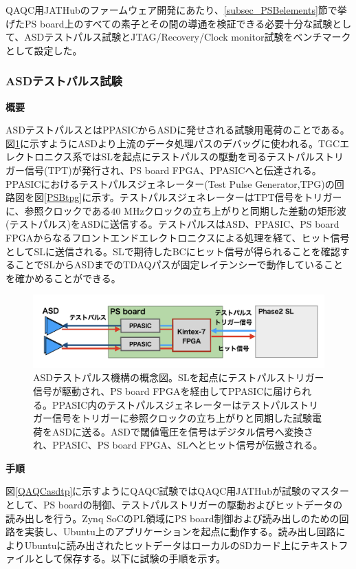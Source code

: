QAQC用JATHubのファームウェア開発にあたり、\ref{subsec_PSBelements}節で挙げたPS board上のすべての素子とその間の導通を検証できる必要十分な試験として、ASDテストパルス試験とJTAG/Recovery/Clock monitor試験をベンチマークとして設定した。

\subsubsection{ASDテストパルス試験}
\label{subsubsec_testpulse}
\textbf{概要}\par
ASDテストパルスとはPPASICからASDに発せされる試験用電荷のことである。
図\ref{PSBasdtp}に示すようにASDより上流のデータ処理パスのデバッグに使われる。TGCエレクトロニクス系ではSLを起点にテストパルスの駆動を司るテストパルストリガー信号(TPT)が発行され、PS board FPGA、PPASICへと伝達される。PPASICにおけるテストパルスジェネレーター(Test Pulse Generator,TPG)の回路図を図\ref{PSBtpg}に示す。テストパルスジェネレーターはTPT信号をトリガーに、参照クロックである40 MHzクロックの立ち上がりと同期した差動の矩形波(テストパルス)をASDに送信する。テストパルスはASD、PPASIC、PS board FPGAからなるフロントエンドエレクトロニクスによる処理を経て、ヒット信号としてSLに送信される。SLで期待したBCにヒット信号が得られることを確認することでSLからASDまでのTDAQパスが固定レイテンシーで動作していることを確かめることができる。
\baselineskip
\begin{figure} 
\centering
\includegraphics[width=16cm]{fig/QAQC/PSBasdtp.png}
\caption[ASDテストパルスの概念図]{ASDテストパルス機構の概念図。SLを起点にテストパルストリガー信号が駆動され、PS board FPGAを経由してPPASICに届けられる。PPASIC内のテストパルスジェネレーターはテストパルストリガー信号をトリガーに参照クロックの立ち上がりと同期した試験電荷をASDに送る。ASDで閾値電圧を信号はデジタル信号へ変換され、PPASIC、PS board FPGA、SLへとヒット信号が伝搬される。}
\label{PSBasdtp}
\end{figure}

\textbf{手順}\par
図\ref{QAQCasdtp}に示すようにQAQC試験ではQAQC用JATHubが試験のマスターとして、PS boardの制御、テストパルストリガーの駆動およびヒットデータの読み出しを行う。Zynq SoCのPL領域にPS board制御および読み出しのための回路を実装し、Ubuntu上のアプリケーションを起点に動作する。読み出し回路によりUbuntuに読み出されたヒットデータはローカルのSDカード上にテキストファイルとして保存する。以下に試験の手順を示す。

